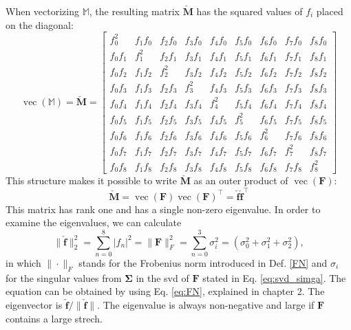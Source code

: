 When vectorizing $\mathbb{M}$, the resulting matrix $\mathbf{\check{M}}$ has the squared values of $f_i$ placed on the diagonal:
\[
\operatorname{vec}(\mathbb{M})= \mathbf{\check{M}} = \begin{bmatrix} f_0^2 & f_1f_0 & f_2f_0 & f_3f_0 & f_4f_0 & f_5f_0 & f_6f_0 & f_7f_0 & f_8f_0 \\ f_0f_1 & f_1^2 & f_2f_1 & f_3f_1 & f_4f_1 & f_5f_1 & f_6f_1 & f_7f_1 & f_8f_1 \\ f_0f_2 & f_1f_2 & f_2^2 & f_3f_2 & f_4f_2 & f_5f_2 & f_6f_2 & f_7f_2 & f_8f_2 \\ f_0f_3 & f_1f_3 & f_2f_3 & f_3^2 & f_4f_3 & f_5f_3 & f_6f_3 & f_7f_3 & f_8f_3 \\ f_0f_4 & f_1f_4 & f_2f_4 & f_3f_4 & f_4^2 & f_5f_4 & f_6f_4 & f_7f_4 & f_8f_4 \\ f_0f_5 & f_1f_5 & f_2f_5 & f_3f_5 & f_4f_5 & f_5^2 & f_6f_5 & f_7f_5 & f_8f_5 \\ f_0f_6 & f_1f_6 & f_2f_6 & f_3f_6 & f_4f_6 & f_5f_6 & f_6^2 & f_7f_6 & f_8f_6 \\ f_0f_7 & f_1f_7 & f_2f_7 & f_3f_7 & f_4f_7 & f_5f_7 & f_6f_7 & f_7^2 & f_8f_7 \\ f_0f_8 & f_1f_8 & f_2f_8 & f_3f_8 & f_4f_8 & f_5f_8 & f_6f_8 & f_7f_8 & f_8^2 \end{bmatrix}
\]
This structure makes it possible to write $\mathbf{\check{M}}$ as an outer product of $\operatorname{vec}(\mathbf{F})$:
\[
\mathbf{\check{M}}= \operatorname{vec}(\mathbf{F})\operatorname{vec}(\mathbf{F})^\intercal = \mathbf{\check{f}} \mathbf{\check{f}}^\intercal
\]
This matrix has rank one and has a single non-zero eigenvalue. In order to examine the eigenvalues, we can calculate
\[
\| \mathbf{\check{f}} \|^{2}_{2} = \sum_{n=0}^8 | f_n |^2 = \| \mathbf{F} \|^{2}_{F} = \sum_{n=0}^3 \sigma^2_i = \left( \sigma_0^2 + \sigma_1^2 + \sigma_2^2 \right),
\]
in which $\|\cdot\|_F$ stands for the Frobenius norm introduced in Def. \ref{FN} and $\sigma_i$ for the singular values from $\mathbf{\Sigma}$ in the \acrshort{svd} of $\mathbf{F}$ stated in Eq. \ref{eq:svd_simga}. The equation can be obtained by using Eq. \ref{eq:FN}, explained in chapter 2. The eigenvector is $\mathbf{\check{f}} / \| \mathbf{\check{f}} \|$. The eigenvalue is always non-negative and large if $\mathbf{F}$ contains a large strech.

